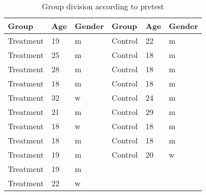 \begin{table}
    \caption{Group division according to pretest}
    \centering
    \begin{tabular}{lll|lll}
    \toprule
    Group     & Age & Gender & Group & Age & Gender  \\
    \midrule
    Treatment & 19  & m              & Control & 22 & m  \\
    Treatment & 25  & m              & Control & 18 & m  \\
    Treatment & 28  & m              & Control & 18 & m  \\
    Treatment & 18  & m              & Control & 18 & m  \\
    Treatment & 32  & w              & Control & 24 & m  \\
    Treatment & 21  & m              & Control & 29 & m  \\
    Treatment & 18  & w              & Control & 18 & m  \\
    Treatment & 18  & m              & Control & 18 & m  \\
    Treatment & 19  & m              & Control & 20 & w  \\
    Treatment & 19  & m              \\
    Treatment & 22  & w              \\
    \bottomrule
    \end{tabular}
    \label{tab_group_division}
    \end{table}
